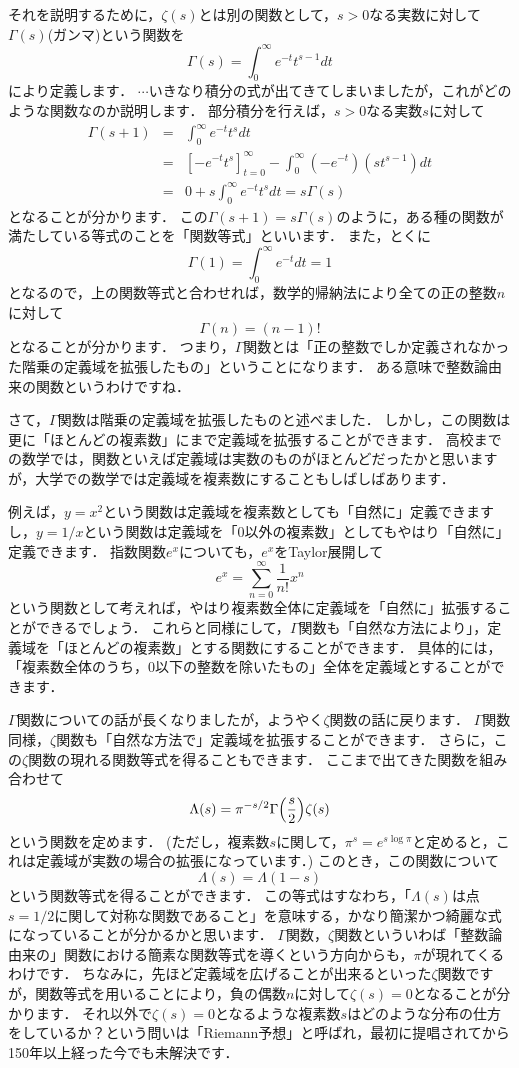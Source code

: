 それを説明するために，$\zeta(s)$とは別の関数として，$s>0$なる実数に対して$\Gamma (s)$(ガンマ)という関数を
\[
	\Gamma (s) = \int_{0}^{\infty} e^{-t}t^{s-1}dt
\]
により定義します．
$\cdots$いきなり積分の式が出てきてしまいましたが，これがどのような関数なのか説明します．
部分積分を行えば，$s>0$なる実数$s$に対して
\begin{eqnarray*}
	\Gamma(s+1) &=& \int_{0}^{\infty} e^{-t}t^{s}dt \\
	&=& \left[ -e^{-t}t^{s} \right]_{t=0}^{\infty} - \int_{0}^{\infty} (-e^{-t})(st^{s-1})dt \\
	&=& 0+s\int_{0}^{\infty} e^{-t}t^{s}dt =s\Gamma(s)
\end{eqnarray*}
となることが分かります．
この$\Gamma(s+1)=s\Gamma(s)$のように，ある種の関数が満たしている等式のことを「関数等式」といいます．
また，とくに
\[
\Gamma(1)=\int_{0}^{\infty} e^{-t}dt=1
\]
となるので，上の関数等式と合わせれば，数学的帰納法により全ての正の整数$n$に対して
\[
	\Gamma(n)=(n-1)!
\]
となることが分かります．
つまり，$\Gamma$関数とは「正の整数でしか定義されなかった階乗の定義域を拡張したもの」ということになります．
ある意味で整数論由来の関数というわけですね．

さて，$\Gamma$関数は階乗の定義域を拡張したものと述べました．
しかし，この関数は更に「ほとんどの複素数」にまで定義域を拡張することができます．
高校までの数学では，関数といえば定義域は実数のものがほとんどだったかと思いますが，大学での数学では定義域を複素数にすることもしばしばあります．

例えば，$y=x^2$という関数は定義域を複素数としても「自然に」定義できますし，$y=1/x$という関数は定義域を「$0$以外の複素数」としてもやはり「自然に」定義できます．
指数関数$e^x$についても，$e^x$をTaylor展開して
\[
	e^x = \sum_{n=0}^{\infty} \frac{1}{n!}x^{n}
\]
という関数として考えれば，やはり複素数全体に定義域を「自然に」拡張することができるでしょう．
これらと同様にして，$\Gamma$関数も「自然な方法により」，定義域を「ほとんどの複素数」とする関数にすることができます．
具体的には，「複素数全体のうち，$0$以下の整数を除いたもの」全体を定義域とすることができます．

$\Gamma$関数についての話が長くなりましたが，ようやく$\zeta$関数の話に戻ります．
$\Gamma$関数同様，$\zeta$関数も「自然な方法で」定義域を拡張することができます．
さらに，この$\zeta$関数の現れる関数等式を得ることもできます．
ここまで出てきた関数を組み合わせて
\[
\Lambda (s)=\pi ^{-s/2} \Gamma\Bigl(\frac{s}{2}\Bigr) \zeta (s)
\]
という関数を定めます．
(ただし，複素数$s$に関して，$\pi ^s = e^{s \log \pi }$と定めると，これは定義域が実数の場合の拡張になっています．)
このとき，この関数について
\[
\Lambda (s)=\Lambda(1-s)
\]
という関数等式を得ることができます．
この等式はすなわち，「$\Lambda (s)$は点$s=1/2$に関して対称な関数であること」を意味する，かなり簡潔かつ綺麗な式になっていることが分かるかと思います．
$\Gamma$関数，$\zeta$関数といういわば「整数論由来の」関数における簡素な関数等式を導くという方向からも，$\pi$が現れてくるわけです．
ちなみに，先ほど定義域を広げることが出来るといった$\zeta$関数ですが，関数等式を用いることにより，負の偶数$n$に対して$\zeta (s)=0$となることが分かります．
それ以外で$\zeta (s)=0$となるような複素数$s$はどのような分布の仕方をしているか？という問いは「Riemann予想」と呼ばれ，最初に提唱されてから150年以上経った今でも未解決です．

